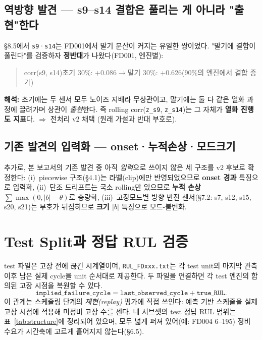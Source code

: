 \documentclass[11pt]{article}
\begin{document}
\subsection{역방향 발견 — s9--s14 결합은 풀리는 게 아니라 "출현"한다}

\S8.5에서 \texttt{s9}·\texttt{s14}는 FD001에서 말기 분산이 커지는 유일한 쌍이었다.
"말기에 결합이 풀린다"를 검증하자 \textbf{정반대}가 나왔다(FD001, 엔진별):

\begin{quote}\ttfamily
corr(s9, s14)\quad 초기 30\%: +0.086\quad$\to$\quad 말기 30\%: +0.626\qquad (90\%의 엔진에서 결합 증가)
\end{quote}

\textbf{해석:} 초기에는 두 센서 모두 노이즈 지배라 무상관이고, 말기에는 둘 다 같은 열화 과정에 끌려가며 상관이 \emph{출현}한다.
즉 rolling corr(\texttt{z\_s9}, \texttt{z\_s14})는 그 자체가 \textbf{열화 진행도 지표}다. $\Rightarrow$ 전처리 v2 채택 (원래 가설과 반대 부호로).

\subsection{기존 발견의 입력화 — onset·누적손상·모드크기}

추가로, 본 보고서의 기존 발견 중 아직 \emph{입력}으로 쓰이지 않은 세 구조를 v2 후보로 확정한다:
(i)~piecewise 구조(\S4.1)는 라벨(clip)에만 반영되었으므로 \textbf{onset 경과} 특징으로 입력화,
(ii)~단조 드리프트는 국소 rolling만 있으므로 \textbf{누적 손상} $\sum\max(0, |b|-\theta)$로 총량화,
(iii)~고장모드별 방향 반전 센서(\S7.2: s7, s12, s15, s20, s21)는 부호가 뒤집히므로 \textbf{크기 $|b|$} 특징으로 모드-불변화.

\section{Test Split과 정답 RUL 검증}
\label{sec:testsplit}

test 파일은 고장 전에 끊긴 시계열이며, \texttt{RUL\_FDxxx.txt}는 각 test unit의 마지막 관측 이후 남은 실제 cycle을 unit 순서대로 제공한다.
두 파일을 연결하면 각 test 엔진의 함의된 고장 시점을 복원할 수 있다.
\[
  \texttt{implied\_failure\_cycle} = \texttt{last\_observed\_cycle} + \texttt{true\_RUL}.
\]
이 관계는 스케줄링 단계의 \emph{재현(replay)} 평가에 직접 쓰인다: 예측 기반 스케줄을 실제 고장 시점에 적용해 미정비 고장 수를 센다.
네 서브셋의 test 정답 RUL 범위는 표~\ref{tab:structure}에 정리되어 있으며, 모두 넓게 퍼져 있어(예: FD004 6--195) 정비 수요가 시간축에 고르게 흩어지지 않는다(\S6.5).
\end{document}
